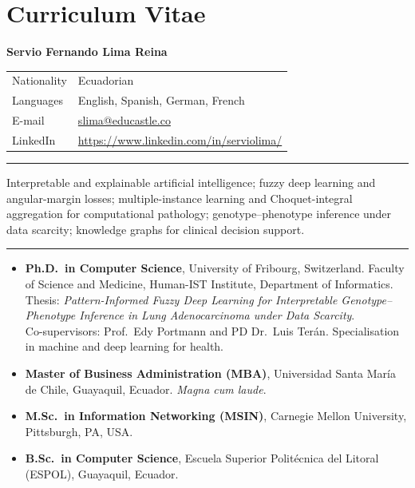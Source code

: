 \chapter{Curriculum Vitae}
\label{app:cv}

\newenvironment{cvlist}{%
  \begin{itemize}[leftmargin=3.3cm,labelwidth=3.0cm,labelsep=0.3cm,
                  align=left,itemsep=0.45em,topsep=0.3em,parsep=0pt]
  \raggedright}%
  {\end{itemize}}
\newcommand{\cvsection}[1]{\par\medskip\noindent{\large\bfseries #1}\par
  \vspace{-0.4em}\noindent\rule{\textwidth}{0.4pt}\par}

\noindent
{\Large\bfseries Servio Fernando Lima Reina}\\[0.4em]
\def\cvprivaterows{}
\begin{tabular}{@{}ll@{}}
  \cvprivaterows
  Nationality   & Ecuadorian \\
  Languages     & English, Spanish, German, French \\
  E-mail        & \href{mailto:slima@educastle.co}{slima@educastle.co} \\
  LinkedIn      & \url{https://www.linkedin.com/in/serviolima/} \\
\end{tabular}

\cvsection{Research Interests}
\noindent
Interpretable and explainable artificial intelligence; fuzzy deep learning
and angular-margin losses; multiple-instance learning and Choquet-integral
aggregation for computational pathology; genotype--phenotype inference
under data scarcity; knowledge graphs for clinical decision support.

\cvsection{Education}
\begin{cvlist}
  \item[2019--2026] \textbf{Ph.D.\ in Computer Science}, University of
    Fribourg, Switzerland. Faculty of Science and Medicine, Human-IST
    Institute, Department of Informatics.\\
    Thesis: \emph{Pattern-Informed Fuzzy Deep Learning for Interpretable
    Genotype--Phenotype Inference in Lung Adenocarcinoma under Data
    Scarcity}.\\
    Co-supervisors: Prof.\ Edy Portmann and PD Dr.\ Luis Ter\'an.
    Specialisation in machine and deep learning for health.
  \item[2004--2005] \textbf{Master of Business Administration (MBA)},
    Universidad Santa Mar\'ia de Chile, Guayaquil, Ecuador.
    \emph{Magna cum laude}.
  \item[1999--2001] \textbf{M.Sc.\ in Information Networking (MSIN)},
    Carnegie Mellon University, Pittsburgh, PA, USA.
  \item[1990--1995] \textbf{B.Sc.\ in Computer Science}, Escuela Superior
    Polit\'ecnica del Litoral (ESPOL), Guayaquil, Ecuador.
\end{cvlist}

